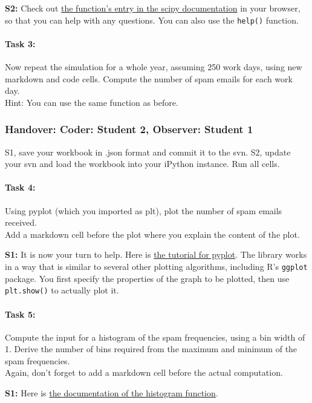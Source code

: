 \documentclass{article}
\begin{document}
\textbf{S2:} Check out \href{http://docs.scipy.org/doc/numpy/reference/generated/numpy.random.binomial.html}{the function's entry in the scipy documentation} in your browser, so that you can help with any questions. You can also use the \texttt{help()} function.


\paragraph{Task 3:} Now repeat the simulation for a whole year, assuming 250 work days, using new markdown and code cells. Compute the number of spam emails for each work day. \\
Hint: You can use the same function as before. 

\subsubsection*{Handover: Coder: Student 2, Observer: Student 1}

S1, save your workbook in .json format and commit it to the svn. S2, update your svn and load the workbook into your iPython instance. Run all cells. 

\paragraph{Task 4:} Using pyplot (which you imported as plt), plot the number of spam emails received.\\
Add a markdown cell before the plot where you explain the content of the plot. 

\textbf{S1:} It is now your turn to help. Here is \href{http://matplotlib.org/users/pyplot_tutorial.html}{the tutorial for pyplot}. The library works in a way that is similar to several other plotting algorithms, including R's \texttt{ggplot} package. You first specify the properties of the graph to be plotted, then use \texttt{plt.show()} to actually plot it. 

\paragraph{Task 5:} Compute the input for a histogram of the spam frequencies, using a bin width of 1. Derive the number of bins required from the maximum and minimum of the spam frequencies.\\
Again, don't forget to add a markdown cell before the actual computation. 

\textbf{S1:} Here is \href{http://docs.scipy.org/doc/numpy/reference/generated/numpy.histogram.html#numpy.histogram}{the documentation of the histogram function}. 
\end{document}
